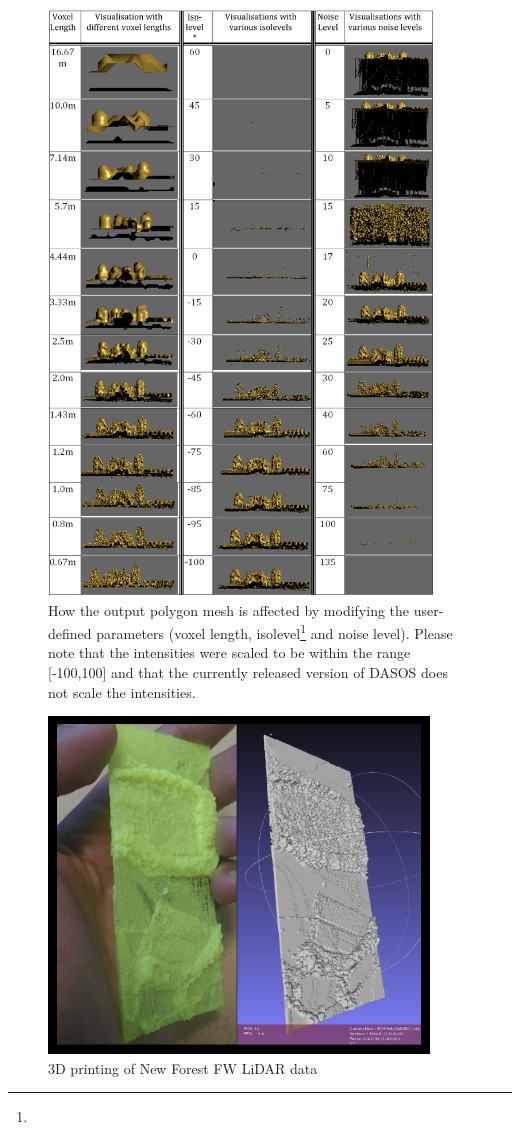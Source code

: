 \documentclass{subfiles}
\begin{document}
  
  \begin{figure} [h!]
  	\centering
  	\includegraphics[width=0.91\textwidth]{img/SwitchingParameters}
  	\caption[Polygonisation Parameters]{How the output polygon mesh is affected by modifying the user-defined parameters (voxel length, isolevel\footnote{} and noise level). Please note that the intensities were scaled to be within the range [-100,100] and that the currently released version of DASOS does not scale the intensities.}
  	\label{fig:SwitchingVisParameters}
  \end{figure}
  

  
   \begin{figure} [h!]
   	\centering
   	\includegraphics[width=0.9\textwidth]{img/NF-3Dprint}
   	\caption[3D printing]{3D printing of New Forest FW LiDAR data}
   	\label{fig:3Dprinting}
   \end{figure}

 
\end{document}
